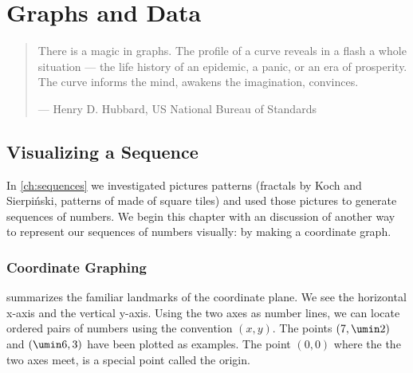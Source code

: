 \chapter{Graphs and Data}
\label{ch:graphs}

\begin{quote}
There is a magic in graphs. The profile of a curve reveals in a flash a whole situation --- the life history of an epidemic, a panic, or an era of prosperity. The curve informs the mind, awakens the imagination, convinces.
\par\hfill --- Henry D. Hubbard, US National Bureau of Standards
\end{quote}

\section{Visualizing a Sequence}
\label{sec:vizsequence}

In \cref{ch:sequences} we investigated pictures patterns (fractals by Koch and Sierpi\'nski, patterns of made of square tiles) and used those pictures to generate sequences of numbers. We begin this chapter with an discussion of another way to represent our sequences of numbers visually: by making a coordinate graph.

\subsection{Coordinate Graphing}

 summarizes the familiar landmarks of the \gls{coordinate plane}. We see the horizontal \gls{x-axis} and the vertical \gls{y-axis}. Using the two axes as number lines, we can locate \glspl{ordered pair} of numbers using the convention $(x,y)$. The points $(7, \umin2)$ and $(\umin6, 3)$ have been plotted as examples. The point $(0,0)$ where the the two axes meet, is a special point called the \gls{origin}.


